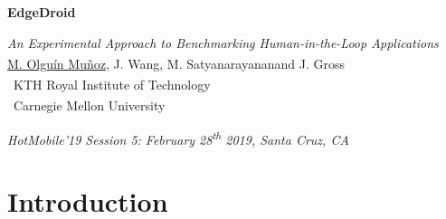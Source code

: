 \documentclass[aspectratio=1610]{beamer}
\newcommand{\kthaffil}{\textsuperscript{\textdagger}}
\newcommand{\cmuaffil}{\textsuperscript{\textdaggerdbl}}
\begin{document}
\startpage
\begin{frame}{}
    \begin{center}
        \begin{LARGE}
            \textbf{EdgeDroid}\\
        \end{LARGE}
        \emph{An Experimental Approach to Benchmarking Human-in-the-Loop Applications}\\
        \vspace{0.02\textheight}
        {\footnotesize \underline{M. Olguín Muñoz}\kthaffil, J. Wang\cmuaffil, M. Satyanarayanan\cmuaffil and J. Gross\kthaffil\\
            \vspace{0.02\textheight}
            \kthaffil~KTH Royal Institute of Technology\\
            \cmuaffil~Carnegie Mellon University\\}
    \end{center}

    \vspace{0.04\textheight}

    \begin{tiny}
        \raggedleft%
        \emph{HotMobile'19 Session 5: February 28\textsuperscript{th} 2019, Santa Cruz, CA}\\
    \end{tiny}
\end{frame}

\normalpage%
{
    \AtBeginSection[]{}
    \section{Introduction}
}

\begin{frame}{}
    \begin{center}
        \\
    \end{center}
\end{frame}
\end{document}
